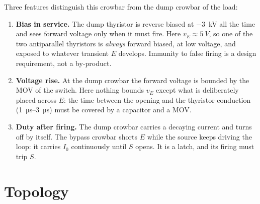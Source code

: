 \documentclass[11pt,a4paper]{article}
\begin{document}
Three features distinguish this crowbar from the dump crowbar of the load:

\begin{enumerate}
\item \textbf{Bias in service.} The dump thyristor is reverse biased at \SI{-3}{kV} all the
      time and sees forward voltage only when it must fire. Here $v_E \approx \SI{5}{V}$, so one
      of the two antiparallel thyristors is \emph{always} forward biased, at low voltage, and
      exposed to whatever transient $E$ develops. Immunity to false firing is a design
      requirement, not a by-product.
\item \textbf{Voltage rise.} At the dump crowbar the forward voltage is bounded by the MOV of
      the switch. Here nothing bounds $v_E$ except what is deliberately placed across $E$: the
      time between the opening and the thyristor conduction (\SIrange{1}{3}{\micro s}) must be
      covered by a capacitor and a MOV.
\item \textbf{Duty after firing.} The dump crowbar carries a decaying current and turns off by
      itself. The bypass crowbar shorts $E$ while the source keeps driving the loop: it carries
      $I_0$ continuously until $S$ opens. It is a latch, and its firing must trip $S$.
\end{enumerate}

\section{Topology}
\end{document}
